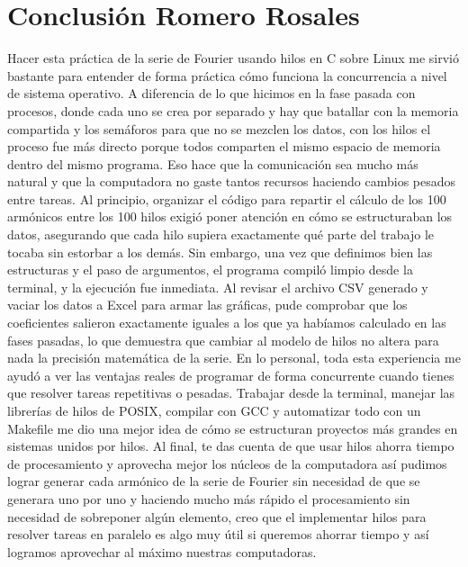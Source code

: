 \clearpage

\section*{Conclusión Romero Rosales}

Hacer esta práctica de la serie de Fourier usando hilos en C sobre Linux me sirvió bastante para entender de forma práctica cómo funciona la concurrencia a nivel de sistema operativo. A diferencia de lo que hicimos en la fase pasada con procesos, donde cada uno se crea por separado y hay que batallar con la memoria compartida y los semáforos para que no se mezclen los datos, con los hilos el proceso fue más directo porque todos comparten el mismo espacio de memoria dentro del mismo programa. Eso hace que la comunicación sea mucho más natural y que la computadora no gaste tantos recursos haciendo cambios pesados entre tareas.
Al principio, organizar el código para repartir el cálculo de los 100 armónicos entre los 100 hilos exigió poner atención en cómo se estructuraban los datos, asegurando que cada hilo supiera exactamente qué parte del trabajo le tocaba sin estorbar a los demás. Sin embargo, una vez que definimos bien las estructuras y el paso de argumentos, el programa compiló limpio desde la terminal, y la ejecución fue inmediata. Al revisar el archivo CSV generado y vaciar los datos a Excel para armar las gráficas, pude comprobar que los coeficientes salieron exactamente iguales a los que ya habíamos calculado en las fases pasadas, lo que demuestra que cambiar al modelo de hilos no altera para nada la precisión matemática de la serie.
En lo personal, toda esta experiencia me ayudó a ver las ventajas reales de programar de forma concurrente cuando tienes que resolver tareas repetitivas o pesadas. Trabajar desde la terminal, manejar las librerías de hilos de POSIX, compilar con GCC y automatizar todo con un Makefile me dio una mejor idea de cómo se estructuran proyectos más grandes en sistemas unidos por hilos. Al final, te das cuenta de que usar hilos ahorra tiempo de procesamiento y aprovecha mejor los núcleos de la computadora así pudimos lograr generar cada armónico de la serie de Fourier sin necesidad de que se generara uno por uno y haciendo mucho más rápido el procesamiento sin necesidad de sobreponer algún elemento, creo que el implementar hilos para resolver tareas en paralelo es algo muy útil si queremos ahorrar tiempo y así logramos aprovechar al máximo nuestras computadoras.

\clearpage


